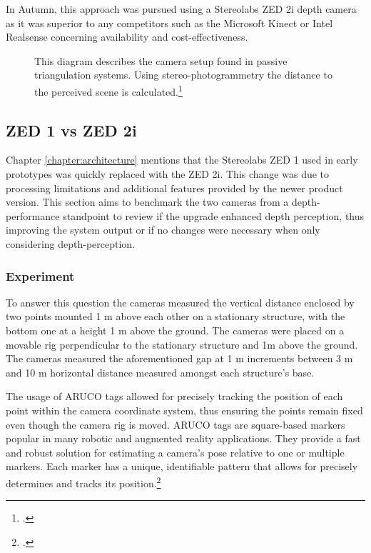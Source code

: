 In Autumn, this approach was pursued using a Stereolabs ZED 2i depth camera as it was superior to any competitors such as the Microsoft Kinect or Intel Realsense concerning availability and cost-effectiveness. 

\begin{figure}
	\centering
	
	\caption{
		This diagram describes the camera setup found in passive triangulation systems. Using stereo-photogrammetry the distance to the perceived scene is calculated.\footcite{altuntas2021triangulation}
	}
	\label{fig:passiveTriangulation}
\end{figure}

\subsection{ZED 1 vs ZED 2i}
Chapter \ref{chapter:architecture} mentions that the Stereolabs ZED 1 used in early prototypes was quickly replaced with the ZED 2i. This change was due to processing limitations and additional features provided by the newer product version.
This section aims to benchmark the two cameras from a depth-performance standpoint to review if the upgrade enhanced depth perception, thus improving the system output or if no changes were necessary when only considering depth-perception.

\subsubsection{Experiment}
To answer this question the cameras measured the vertical distance enclosed by two points mounted 1 m above each other on a stationary structure, with the bottom one at a height 1 m above the ground. 
The cameras were placed on a movable rig perpendicular to the stationary structure and 1m above the ground.  The cameras measured the aforementioned gap at 1 m increments between 3 m and 10 m horizontal distance measured amongst each structure's base. 

The usage of ARUCO tags allowed for precisely tracking the position of each point within the camera coordinate system, thus ensuring the points remain fixed even though the camera rig is moved. 
ARUCO tags are square-based markers popular in many robotic and augmented reality applications. They provide a fast and robust solution for estimating a camera's pose relative to one or multiple markers. Each marker has a unique, identifiable pattern that allows for precisely determines and tracks its position.\footcite{jurado2015} 

